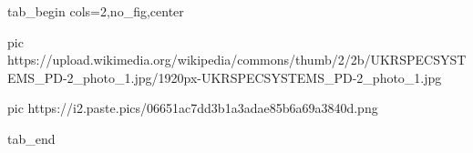  
 
 
 
 


\ifcmt
  tab_begin cols=2,no_fig,center

  pic https://upload.wikimedia.org/wikipedia/commons/thumb/2/2b/UKRSPECSYSTEMS_PD-2_photo_1.jpg/1920px-UKRSPECSYSTEMS_PD-2_photo_1.jpg

	pic https://i2.paste.pics/06651ac7dd3b1a3adae85b6a69a3840d.png

  tab_end
\fi
